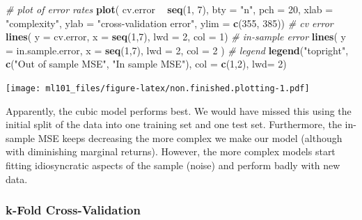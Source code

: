 \documentclass[]{article}
\newenvironment{Shaded}{\begin{snugshade}}{\end{snugshade}}
\newcommand{\CommentTok}[1]{\textcolor[rgb]{0.56,0.35,0.01}{\textit{#1}}}
\newcommand{\DataTypeTok}[1]{\textcolor[rgb]{0.13,0.29,0.53}{#1}}
\newcommand{\DecValTok}[1]{\textcolor[rgb]{0.00,0.00,0.81}{#1}}
\newcommand{\KeywordTok}[1]{\textcolor[rgb]{0.13,0.29,0.53}{\textbf{#1}}}
\newcommand{\NormalTok}[1]{#1}
\newcommand{\OperatorTok}[1]{\textcolor[rgb]{0.81,0.36,0.00}{\textbf{#1}}}
\newcommand{\StringTok}[1]{\textcolor[rgb]{0.31,0.60,0.02}{#1}}
\begin{document}
\begin{Shaded}
\begin{Highlighting}[]
\CommentTok{# plot of error rates}
\KeywordTok{plot}\NormalTok{( cv.error }\OperatorTok{~}\StringTok{ }\KeywordTok{seq}\NormalTok{(}\DecValTok{1}\NormalTok{, }\DecValTok{7}\NormalTok{), }\DataTypeTok{bty =} \StringTok{"n"}\NormalTok{, }\DataTypeTok{pch =} \DecValTok{20}\NormalTok{,}
      \DataTypeTok{xlab =} \StringTok{"complexity"}\NormalTok{, }\DataTypeTok{ylab =} \StringTok{"cross-validation error"}\NormalTok{,}
      \DataTypeTok{ylim =} \KeywordTok{c}\NormalTok{(}\DecValTok{355}\NormalTok{, }\DecValTok{385}\NormalTok{))}
\CommentTok{# cv error}
\KeywordTok{lines}\NormalTok{( }\DataTypeTok{y =}\NormalTok{ cv.error, }\DataTypeTok{x =} \KeywordTok{seq}\NormalTok{(}\DecValTok{1}\NormalTok{,}\DecValTok{7}\NormalTok{), }\DataTypeTok{lwd =} \DecValTok{2}\NormalTok{, }\DataTypeTok{col =} \DecValTok{1}\NormalTok{)}
\CommentTok{# in-sample error}
\KeywordTok{lines}\NormalTok{( }\DataTypeTok{y =}\NormalTok{ in.sample.error, }\DataTypeTok{x =} \KeywordTok{seq}\NormalTok{(}\DecValTok{1}\NormalTok{,}\DecValTok{7}\NormalTok{), }\DataTypeTok{lwd =} \DecValTok{2}\NormalTok{, }\DataTypeTok{col =} \DecValTok{2}\NormalTok{ )}
\CommentTok{# legend}
\KeywordTok{legend}\NormalTok{(}\StringTok{"topright"}\NormalTok{, }\KeywordTok{c}\NormalTok{(}\StringTok{"Out of sample MSE"}\NormalTok{, }\StringTok{"In sample MSE"}\NormalTok{), }\DataTypeTok{col =} \KeywordTok{c}\NormalTok{(}\DecValTok{1}\NormalTok{,}\DecValTok{2}\NormalTok{), }\DataTypeTok{lwd=} \DecValTok{2}\NormalTok{)}
\end{Highlighting}
\end{Shaded}

\texttt{[image: ml101\_files/figure-latex/non.finished.plotting-1.pdf]}

Apparently, the cubic model performs best. We would have missed this using the initial split of the data into one training set and one test set. Furthermore, the in-sample MSE keeps decreasing the more complex we make our model (although with diminishing marginal returns). However, the more complex models start fitting idiosyncratic aspects of the sample (noise) and perform badly with new data.

\hypertarget{k-fold-cross-validation}{%
\subsubsection{k-Fold Cross-Validation}\label{k-fold-cross-validation}}
\end{document}
